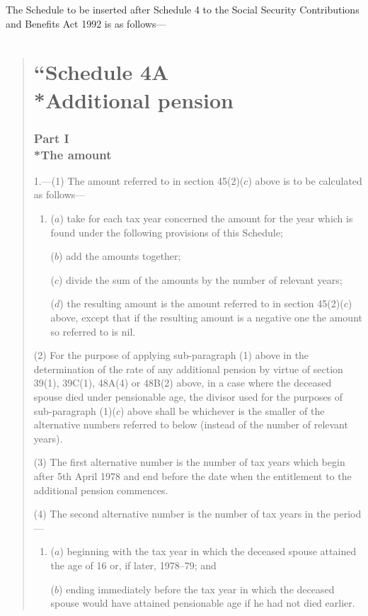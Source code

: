 \documentclass[12pt,a4paper]{article}
\begin{document}
\noindent
The Schedule to be inserted after Schedule 4 to the Social Security Contributions and Benefits Act 1992 is as follows—
\begin{quotation}
\part*{\noindent “Schedule 4A\\*Additional pension}

\section*{Part I\\*The amount}

1.---(1) The amount referred to in section 45(2)($c$)  above is to be calculated as follows—
\begin{enumerate}\item[]
($a$) take for each tax year concerned the amount for the year which is found under the following provisions of this Schedule;

($b$) add the amounts together;

($c$) divide the sum of the amounts by the number of relevant years;

($d$) the resulting amount is the amount referred to in section 45(2)($c$)  above, except that if the resulting amount is a negative one the amount so referred to is nil.
\end{enumerate}

(2) For the purpose of applying sub-paragraph (1)  above in the determination of the rate of any additional pension by virtue of section 39(1), 39C(1), 48A(4)  or 48B(2)  above, in a case where the deceased spouse died under pensionable age, the divisor used for the purposes of sub-paragraph (1)($c$)  above shall be whichever is the smaller of the alternative numbers referred to below (instead of the number of relevant years).

(3) The first alternative number is the number of tax years which begin after 5th April 1978 and end before the date when the entitlement to the additional pension commences.

(4) The second alternative number is the number of tax years in the period—
\begin{enumerate}\item[]
($a$) beginning with the tax year in which the deceased spouse attained the age of 16 or, if later, 1978--79; and

($b$) ending immediately before the tax year in which the deceased spouse would have attained pensionable age if he had not died earlier.
\end{enumerate}


\end{quotation}
\end{document}
